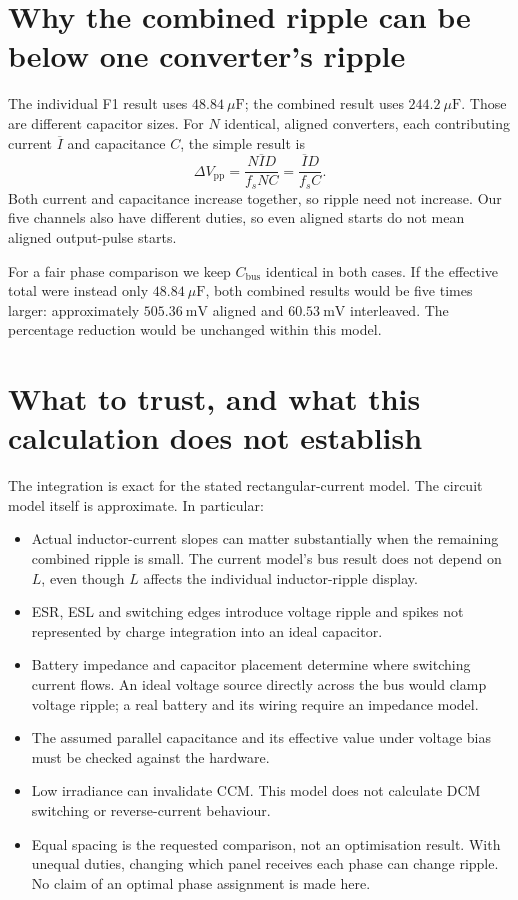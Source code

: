 \documentclass[11pt,a4paper]{article}
\begin{document}
\section{Why the combined ripple can be below one converter's ripple}

The individual F1 result uses $48.84\ \mu\mathrm{F}$; the combined result uses
$244.2\ \mu\mathrm{F}$. Those are different capacitor sizes. For $N$ identical,
aligned converters, each contributing current $\overline I$ and capacitance
$C$, the simple result is
\[
 \Delta V_{\mathrm{pp}}=\frac{N\overline I D}{f_s NC}
                      =\frac{\overline I D}{f_s C}.
\]
Both current and capacitance increase together, so ripple need not increase.
Our five channels also have different duties, so even aligned starts do not
mean aligned output-pulse starts.

For a fair phase comparison we keep $C_{\mathrm{bus}}$ identical in both cases.
If the effective total were instead only $48.84\ \mu\mathrm{F}$, both combined
results would be five times larger: approximately $505.36\ \mathrm{mV}$ aligned
and $60.53\ \mathrm{mV}$ interleaved. The percentage reduction would be unchanged
within this model.

\section{What to trust, and what this calculation does not establish}

The integration is exact for the stated rectangular-current model. The circuit
model itself is approximate. In particular:
\begin{itemize}
 \item Actual inductor-current slopes can matter substantially when the
 remaining combined ripple is small. The current model's bus result does not
 depend on $L$, even though $L$ affects the individual inductor-ripple display.
 \item ESR, ESL and switching edges introduce voltage ripple and spikes not
 represented by charge integration into an ideal capacitor.
 \item Battery impedance and capacitor placement determine where switching
 current flows. An ideal voltage source directly across the bus would clamp
 voltage ripple; a real battery and its wiring require an impedance model.
 \item The assumed parallel capacitance and its effective value under voltage
 bias must be checked against the hardware.
 \item Low irradiance can invalidate CCM. This model does not calculate DCM
 switching or reverse-current behaviour.
 \item Equal spacing is the requested comparison, not an optimisation result.
 With unequal duties, changing which panel receives each phase can change
 ripple. No claim of an optimal phase assignment is made here.
\end{itemize}
\end{document}

